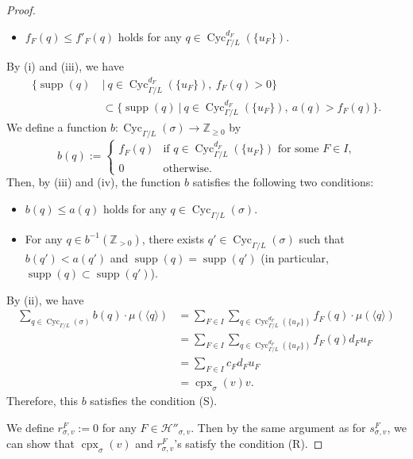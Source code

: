 \documentclass[11pt]{article}
\theoremstyle{definition}
\numberwithin{equation}{section}
\begin{document}
\begin{proof}
\begin{itemize}
\item[(iii)] 
$f_F (q) \le f'_F(q)$ holds for any $q \in \operatorname{Cyc}_{\Gamma /L}^{d_F} (\{ u_F \})$. 
\end{itemize}
By (i) and (iii), we have  
\begin{align*}\tag{iv}
\bigl\{ \operatorname{supp}(q) \ &\big| \  q \in \operatorname{Cyc}_{\Gamma /L}^{d_F} (\{ u_F \}),\ f_F(q)>0 \bigr \} \\
&\subset \bigl\{ \operatorname{supp}(q) \ \big| \  q \in \operatorname{Cyc}_{\Gamma /L}^{d_F} (\{ u_F \}),\ a(q)>f_F(q) \bigr \}. 
\end{align*}
We define a function $b : \operatorname{Cyc}_{\Gamma /L}(\sigma) \to \mathbb{Z}_{\ge 0}$ by 
\[
b(q) := 
\begin{cases}
f_F(q) & \text{if $q \in \operatorname{Cyc}_{\Gamma /L}^{d_F} (\{ u_F \})$ for some $F \in I$,}\\
0 & \text{otherwise.}
\end{cases}
\]
Then, by (iii) and (iv), the function $b$ satisfies the following two conditions:
\begin{itemize}
\item 
$b(q) \le a(q)$ holds for any $q \in \operatorname{Cyc}_{\Gamma /L}(\sigma)$. 

\item 
For any $q \in b^{-1}(\mathbb{Z}_{>0})$, 
there exists $q' \in \operatorname{Cyc}_{\Gamma /L}(\sigma)$ 
such that $b(q') < a(q')$ and $\operatorname{supp}(q) = \operatorname{supp}(q')$ 
(in particular, $\operatorname{supp}(q) \subset \operatorname{supp}(q')$).
\end{itemize}
By (ii), we have 
\begin{align*}
\sum _{q \in \operatorname{Cyc}_{\Gamma /L}(\sigma)} b(q) \cdot \mu (\langle q \rangle) 
&= \sum _{F \in I} \sum _{q \in \operatorname{Cyc}_{\Gamma /L}^{d_F} (\{ u_F \})} f_F(q) \cdot \mu (\langle q \rangle) \\
&= \sum _{F \in I} \sum _{q \in \operatorname{Cyc}_{\Gamma /L}^{d_F} (\{ u_F \})} f_F(q) d_F u_F \\
&= \sum_{F \in I} c_F d_F u_{F} \\
&= \operatorname{cpx}_{\sigma}(v) v. 
\end{align*}
Therefore, this $b$ satisfies the condition (S). 

We define $r_{\sigma, v}^F := 0$ for any $F \in \mathcal{H}''_{\sigma , v}$. 
Then by the same argument as for $s_{\sigma, v}^F$, we can show that 
$\operatorname{cpx}_{\sigma}(v)$ and $r_{\sigma, v}^F$'s satisfy the condition (R).
\end{proof}
\end{document}
